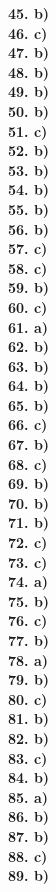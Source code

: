 \documentclass[8pt]{extarticle}
\begin{document}
\begin{multicols}{8}
\textbf{45. b)} \\
\textbf{46. c)} \\
\textbf{47. b)} \\
\textbf{48. b)} \\
\textbf{49. b)} \\
\textbf{50. b)} \\
\textbf{51. c)} \\
\textbf{52. b)} \\
\textbf{53. b)} \\
\textbf{54. b)} \\
\textbf{55. b)} \\
\textbf{56. b)} \\
\textbf{57. c)} \\
\textbf{58. c)} \\
\textbf{59. b)} \\
\textbf{60. c)} \\
\textbf{61. a)} \\
\textbf{62. b)} \\
\textbf{63. b)} \\
\textbf{64. b)} \\
\textbf{65. b)} \\
\textbf{66. c)} \\
\textbf{67. b)} \\
\textbf{68. c)} \\
\textbf{69. b)} \\
\textbf{70. b)} \\
\textbf{71. b)} \\
\textbf{72. c)} \\
\textbf{73. c)} \\
\textbf{74. a)} \\
\textbf{75. b)} \\
\textbf{76. c)} \\
\textbf{77. b)} \\
\textbf{78. a)} \\
\textbf{79. b)} \\
\textbf{80. c)} \\
\textbf{81. b)} \\
\textbf{82. b)} \\
\textbf{83. c)} \\
\textbf{84. b)} \\
\textbf{85. a)} \\
\textbf{86. b)} \\
\textbf{87. b)} \\
\textbf{88. c)} \\
\textbf{89. b)} \\

\end{multicols}
\end{document}

